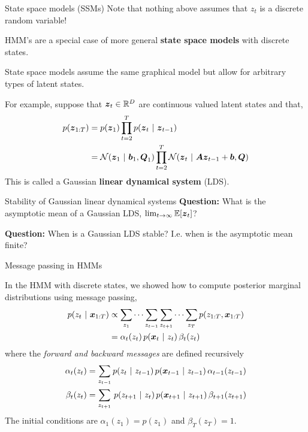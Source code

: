 \documentclass[aspectratio=169]{beamer}
\begin{document}
\begin{frame}{State space models (SSMs)}
    Note that nothing above assumes that $z_t$ is a discrete random variable!
    
    HMM's are a special case of more general \textbf{state space models} with discrete states. 
    
    State space models assume the same graphical model but allow for arbitrary types of latent states. 
    
    For example, suppose that $\boldsymbol{z}_t \in \mathbb{R}^D$ are continuous valued latent states and that,
    \begin{align}
        p(\boldsymbol{z}_{1:T}) &= p(\boldsymbol{z}_1) \prod_{t=2}^T p(\boldsymbol{z}_t ~\vert~ \boldsymbol{z}_{t-1}) \\
        &= \mathcal{N}(\boldsymbol{z}_1 ~\vert~ \boldsymbol{b}_1, \boldsymbol{Q}_1) \prod_{t=2}^T \mathcal{N}(\boldsymbol{z}_t ~\vert~ \boldsymbol{A} \boldsymbol{z}_{t-1} + \boldsymbol{b}, \boldsymbol{Q}) 
    \end{align}
    This is called a Gaussian \textbf{linear dynamical system} (LDS). 
    \end{frame}
    
    \begin{frame}[t]{Stability of Gaussian linear dynamical systems}
        \textbf{Question: } What is the asymptotic mean of a Gaussian LDS, $\lim_{t \to \infty} \mathbb{E}[\boldsymbol{z}_t]$?
        
        \textbf{Question: } When is a Gaussian LDS stable? I.e. when is the asymptotic mean finite?
\end{frame}
    
\begin{frame}{Message passing in HMMs}
    
    In the HMM with discrete states, we showed how to compute posterior marginal distributions using message passing,
    \begin{align}
        p(z_t ~\vert~ \boldsymbol{x}_{1:T}) &\propto \sum_{z_1} \cdots \sum_{z_{t-1}} \sum_{z_{t+1}} \cdots \sum_{z_T} p(z_{1:T}, \boldsymbol{x}_{1:T}) \\
        &= \alpha_t(z_t) \, p(\boldsymbol{x}_t ~\vert~ z_t) \, \beta_t(z_t) 
    \end{align}
    where the \textit{forward and backward messages} are defined recursively
    \begin{align}
        \alpha_t(z_t) &= \sum_{z_{t-1}} p(z_t ~\vert~ z_{t-1}) \, p(\boldsymbol{x}_{t-1} ~\vert~ z_{t-1}) \, \alpha_{t-1}(z_{t-1}) \\
        \beta_t(z_t) &= \sum_{z_{t+1}} \, p(z_{t+1} ~\vert~ z_t) \, p(\boldsymbol{x}_{t+1} ~\vert~ z_{t+1}) \, \beta_{t+1}(z_{t+1})
    \end{align}
    The initial conditions are $\alpha_1(z_1) = p(z_1)$ and $\beta_{T}(z_T) = 1$.
        
\end{frame}
    
\end{document}
